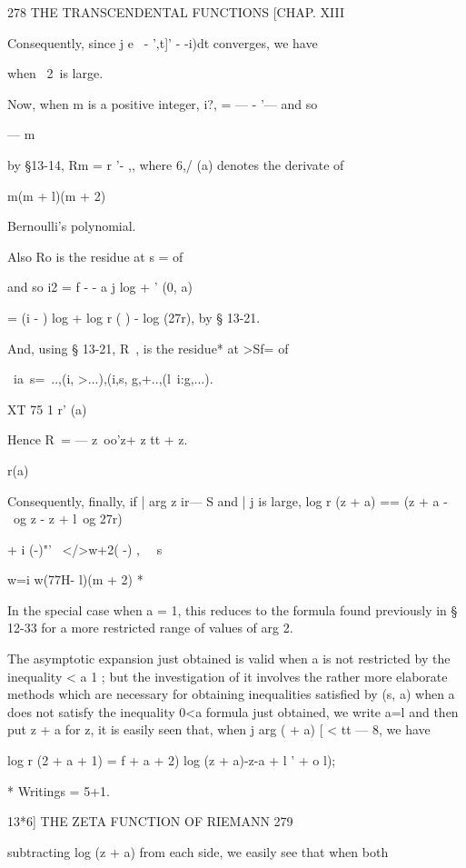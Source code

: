 {{278 THE TRANSCENDENTAL FUNCTIONS [CHAP. XIII 

Consequently, since j e~ - ',t]' - -i)dt converges, we have 

when \ 2\ is large. 

Now, when m is a positive integer, i?,  =  — -  '—  and so 

— m 

by §13-14, Rm =   r '- ,, where 6,/ (a) denotes the derivate of 

m(m + l)(m + 2)     

Bernoulli's polynomial. 

Also Ro is the residue at s = of 

and so i2  = f - - a j log   +  ' (0, a) 

= (i -  ) log   + log r ( ) -   log (27r), 
by § 13-21. 

And, using § 13-21, R\ , is the residue* at >Sf= of 

\ ia\  s=\ ..,(i, >...),(i,s, g,+..,(l\ i:g,...). 

XT 75 1 r' (a) 

Hence R\   = — z\ oo'z+ z  tt  + z. 

r(a) 

Consequently, finally, if | arg z   ir— S and |   j is large, 
log r (z + a) == (z + a -~ \ og z - z + l\ og 27r) 

+ i (-)"'~ </>w+2(  -)  , \  \  s 

w=i w(77H- l)(m + 2)  * 

In the special case when a = 1, this reduces to the formula found 
previously in § 12-33 for a more restricted range of values of arg 2. 

The asymptotic expansion just obtained is valid when a is not restricted 
by the inequality < a   1 ; but the investigation of it involves the rather 
more elaborate methods which are necessary for obtaining inequalities satisfied 
by  (s, a) when a does not satisfy the inequality 0<a%
formula just obtained, we write a=l and then put z + a for z, it is easily 
seen that, when j arg (  + a) [ < tt — 8, we have 

log r (2 + a + 1) = f   + a + 2) log (z + a)-z-a + l    '  + o l); 

* Writings = 5+1. 



13*6] THE ZETA FUNCTION OF RIEMANN 279 

subtracting log (z + a) from each side, we easily see that when both 

}}
